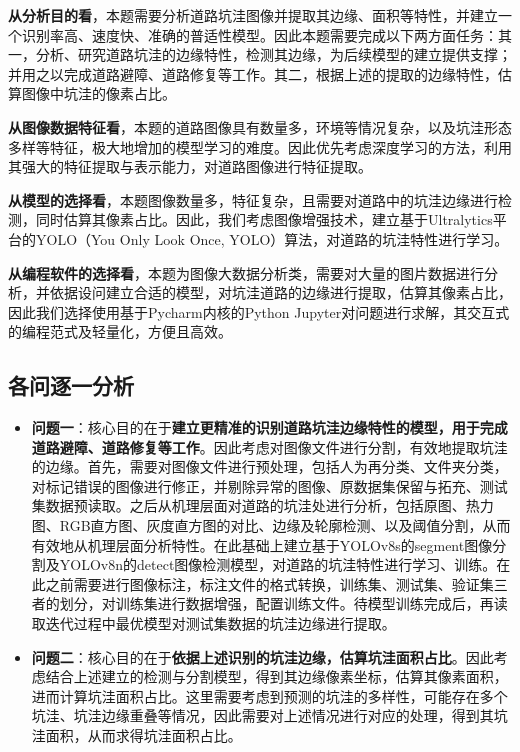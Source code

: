 \documentclass{MathorCupmodeling}
\begin{document}
	\textbf{从分析目的看}，本题需要分析道路坑洼图像并提取其边缘、面积等特性，并建立一个识别率高、速度快、准确的普适性模型。因此本题需要完成以下两方面任务：{\heiti 其一}，分析、研究道路坑洼的边缘特性，检测其边缘，为后续模型的建立提供支撑；并用之以完成道路避障、道路修复等工作。{\heiti 其二}，根据上述的提取的边缘特性，估算图像中坑洼的像素占比。

	\textbf{从图像数据特征看}，本题的道路图像具有数量多，环境等情况复杂，以及坑洼形态多样等特征，极大地增加的模型学习的难度。因此优先考虑深度学习的方法，利用其强大的特征提取与表示能力，对道路图像进行特征提取。

	\textbf{从模型的选择看}，本题图像数量多，特征复杂，且需要对道路中的坑洼边缘进行检测，同时估算其像素占比。因此，我们考虑图像增强技术，建立基于Ultralytics平台的YOLO（You Only Look Once, YOLO）算法，对道路的坑洼特性进行学习。

	\textbf{从编程软件的选择看}，本题为图像大数据分析类，需要对大量的图片数据进行分析，并依据设问建立合适的模型，对坑洼道路的边缘进行提取，估算其像素占比，因此我们选择使用基于Pycharm内核的Python Jupyter对问题进行求解，其交互式的编程范式及轻量化，方便且高效。
	\subsection{各问逐一分析}
	\begin{itemize}
		\item \textbf{问题一}：核心目的在于\textbf{建立更精准的识别道路坑洼边缘特性的模型，用于完成道路避障、道路修复等工作}。因此考虑对图像文件进行分割，有效地提取坑洼的边缘。首先，需要对图像文件进行预处理，包括人为再分类、文件夹分类，对标记错误的图像进行修正，并剔除异常的图像、原数据集保留与拓充、测试集数据预读取。之后从机理层面对道路的坑洼处进行分析，包括原图、热力图、RGB直方图、灰度直方图的对比、边缘及轮廓检测、以及阈值分割，从而有效地从机理层面分析特性。在此基础上建立基于YOLOv8s的segment图像分割及YOLOv8n的detect图像检测模型，对道路的坑洼特性进行学习、训练。在此之前需要进行图像标注，标注文件的格式转换，训练集、测试集、验证集三者的划分，对训练集进行数据增强，配置训练文件。待模型训练完成后，再读取迭代过程中最优模型对测试集数据的坑洼边缘进行提取。
		\item \textbf{问题二}：核心目的在于\textbf{依据上述识别的坑洼边缘，估算坑洼面积占比}。因此考虑结合上述建立的检测与分割模型，得到其边缘像素坐标，估算其像素面积，进而计算坑洼面积占比。这里需要考虑到预测的坑洼的多样性，可能存在多个坑洼、坑洼边缘重叠等情况，因此需要对上述情况进行对应的处理，得到其坑洼面积，从而求得坑洼面积占比。
	\end{itemize}
\end{document}
